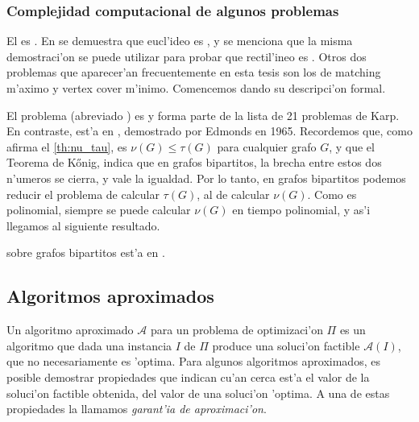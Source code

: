 \subsubsection*{Complejidad computacional de algunos problemas}

El  es  \cite[p. 211]{Ga76}. En \cite{Pa77} se demuestra que  eucl'ideo es , y se menciona que la misma demostraci'on se puede utilizar para probar que  rectil'ineo es . Otros dos problemas que aparecer'an frecuentemente en esta tesis son los de matching m'aximo y vertex cover m'inimo. Comencemos dando su descripci'on formal.



\noindent
El problema  (abreviado ) es  \cite{Ka72} y forma parte de la lista de 21 problemas  de Karp. En contraste,  est'a en , demostrado por Edmonds \cite{Ed87} en 1965. Recordemos que, como afirma el \autoref{th:nu_tau}, es $\nu(G) \leq \tau(G)$ para cualquier grafo $G$, y que el Teorema de K\H{o}nig, indica que en grafos bipartitos, la brecha entre estos dos n'umeros se cierra, y vale la igualdad. Por lo tanto, en grafos bipartitos podemos reducir el problema de calcular $\tau(G)$, al de calcular $\nu(G)$. Como  es polinomial, siempre se puede calcular $\nu(G)$ en tiempo polinomial, y as'i llegamos al siguiente resultado. 

\begin{theorem}
\label{th:vc_sobre_bipartitos_es_polinomial}
 sobre grafos bipartitos est'a en .
\end{theorem}

\subsection{Algoritmos aproximados}

Un algoritmo aproximado $\mathcal{A}$ para un problema de optimizaci'on $\Pi$ es un algoritmo que dada una instancia $I$ de $\Pi$ produce una soluci'on factible $\mathcal{A}(I)$, que no necesariamente es 'optima. Para algunos algoritmos aproximados, es posible demostrar propiedades que indican cu'an cerca est'a el valor de la soluci'on factible obtenida, del valor de una soluci'on 'optima. A una de estas propiedades la llamamos \textit{garant'ia de aproximaci'on}.

